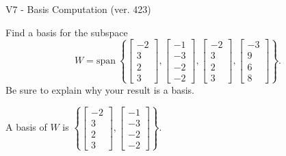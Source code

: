 \begin{exercise}
  \begin{exerciseTitle}V7 - Basis Computation (ver. 423)\end{exerciseTitle}
  \begin{exerciseStatement}
    Find a basis for the subspace 
\[W=\mathrm{span}\ \left\{\left[\begin{array}{r}
-2 \\
3 \\
2 \\
3
\end{array}\right] , \left[\begin{array}{r}
-1 \\
-3 \\
-2 \\
-2
\end{array}\right] , \left[\begin{array}{r}
-2 \\
3 \\
2 \\
3
\end{array}\right] , \left[\begin{array}{r}
-3 \\
9 \\
6 \\
8
\end{array}\right]\right\}.\]
 Be sure to explain why your result is a basis.


  \end{exerciseStatement}
  \begin{exerciseAnswer}
   A basis of \(W\) is  \(\left\{\left[\begin{array}{r}
-2 \\
3 \\
2 \\
3
\end{array}\right] , \left[\begin{array}{r}
-1 \\
-3 \\
-2 \\
-2
\end{array}\right]\right\}\).
  


  \end{exerciseAnswer}
\end{exercise}